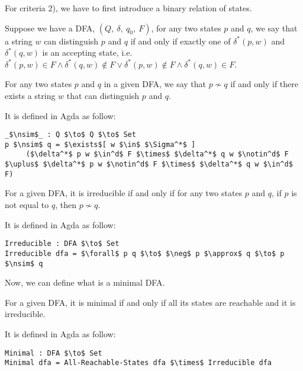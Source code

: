 \par For criteria 2), we have to first introduce a binary relation of states. 
\begin{defn}
\noindent Suppose we have a DFA, \((Q,\ \delta,\ q_0,\ F)\), for any two states \(p\) and \(q\), we say that a string
\(w\) can distinguish \(p\) and \(q\) if and only if exactly one of
\(\delta^*(p,w)\) and \(\delta^*(q,w)\) is an accepting state,
i.e. \(\delta^*(p,w) \in F \wedge \delta^*(q,w) \notin F \vee
\delta^*(p,w) \notin F \wedge \delta^*(q,w) \in F\). 
\end{defn}

\begin{defn}
\noindent For any two states \(p\) and \(q\) in a given DFA, we say that \(p \nsim
q\) if and only if there exists a string \(w\) that can distinguish
\(p\) and \(q\). 
\end{defn}

\par It is defined in Agda as follow:
\begin{lstlisting}[mathescape=true,xleftmargin=.1\textwidth]
_$\nsim$_ : Q $\to$ Q $\to$ Set
p $\nsim$ q = $\exists$[ w $\in$ $\Sigma^*$ ] 
     ($\delta^*$ p w $\in^d$ F $\times$ $\delta^*$ q w $\notin^d$ F $\uplus$ $\delta^*$ p w $\notin^d$ F $\times$ $\delta^*$ q w $\in^d$ F)
\end{lstlisting}

\begin{defn}
\noindent For a given DFA, it is irreducible if and only if for any
two states \(p\) and \(q\), if \(p\) is not equal to \(q\), then \(p \nsim q\). 
\end{defn}

\par It is defined in Agda as follow:
\begin{lstlisting}[mathescape=true,xleftmargin=.1\textwidth]
Irreducible : DFA $\to$ Set
Irreducible dfa = $\forall$ p q $\to$ $\neg$ p $\approx$ q $\to$ p $\nsim$ q
\end{lstlisting}

\par Now, we can define what is a minimal DFA. 

\begin{defn}
\noindent For a given DFA, it is minimal if and only if all its states
are reachable and it is irreducible. 
\end{defn}

\par It is defined in Agda as follow:
\begin{lstlisting}[mathescape=true,xleftmargin=.1\textwidth]
Minimal : DFA $\to$ Set
Minimal dfa = All-Reachable-States dfa $\times$ Irreducible dfa
\end{lstlisting}

